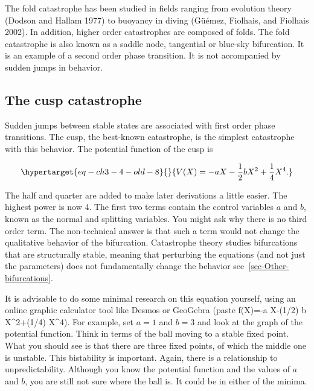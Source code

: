 \documentclass[
  a4paper,
  DIV=11,
  numbers=noendperiod,
  oneside]{scrreprt}
\begin{document}
The fold catastrophe has been studied in fields ranging from evolution
theory (Dodson and Hallam 1977) to buoyancy in diving (Güémez, Fiolhais,
and Fiolhais 2002). In addition, higher order catastrophes are composed
of folds. The fold catastrophe is also known as a saddle node,
tangential or blue-sky bifurcation. It is an example of a second order
phase transition. It is not accompanied by sudden jumps in behavior.

\hypertarget{sec-The-cusp-catastrophe}{%
\subsection{The cusp catastrophe}\label{sec-The-cusp-catastrophe}}

Sudden jumps between stable states are associated with first order phase
transitions. The cusp, the best-known catastrophe, is the simplest
catastrophe with this behavior. The potential function of the cusp is

\begin{equation}\protect\hypertarget{eq-ch3-4-old-8}{}{ V(X) = - aX - \frac{1}{2}bX^{2} + \frac{1}{4}X^{4}. }\label{eq-ch3-4-old-8}\end{equation}

The half and quarter are added to make later derivations a little
easier. The highest power is now 4. The first two terms contain the
control variables \(a\) and \(b\), known as the normal and splitting
variables. You might ask why there is no third order term. The
non-technical answer is that such a term would not change the
qualitative behavior of the bifurcation. Catastrophe theory studies
bifurcations that are structurally stable, meaning that perturbing the
equations (and not just the parameters) does not fundamentally change
the behavior see~\ref{sec-Other-bifurcations}.

It is advisable to do some minimal research on this equation yourself,
using an online graphic calculator tool like Desmos or GeoGebra (paste
f(X)=-a X-(1/2) b X\^{}2+(1/4) X\^{}4). For example, set \(a = 1\) and
\(b = 3\) and look at the graph of the potential function. Think in
terms of the ball moving to a stable fixed point. What you should see is
that there are three fixed points, of which the middle one is unstable.
This bistability is important. Again, there is a relationship to
unpredictability. Although you know the potential function and the
values of \(a\) and \(b\), you are still not sure where the ball is. It
could be in either of the minima.
\end{document}
